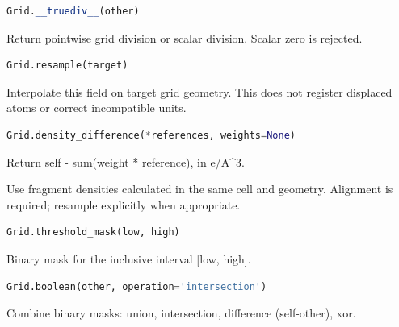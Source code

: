 \begin{samepage}

\begin{lstlisting}[language=Python]
Grid.__truediv__(other)
\end{lstlisting}

Return pointwise grid division or scalar division. Scalar zero is rejected.

\end{samepage}



\begin{samepage}

\begin{lstlisting}[language=Python]
Grid.resample(target)
\end{lstlisting}

Interpolate this field on target grid geometry. This does not register displaced atoms or correct incompatible units.

\end{samepage}



\begin{samepage}

\begin{lstlisting}[language=Python]
Grid.density_difference(*references, weights=None)
\end{lstlisting}

Return self - sum(weight * reference), in e/\allowbreak{}A\textasciicircum{}3.

Use fragment densities calculated in the same cell and geometry.
Alignment is required; resample explicitly when appropriate.

\end{samepage}



\begin{samepage}

\begin{lstlisting}[language=Python]
Grid.threshold_mask(low, high)
\end{lstlisting}

Binary mask for the inclusive interval [low, high].

\end{samepage}



\begin{samepage}

\begin{lstlisting}[language=Python]
Grid.boolean(other, operation='intersection')
\end{lstlisting}

Combine binary masks: union, intersection, difference (self-other), xor.

\end{samepage}



